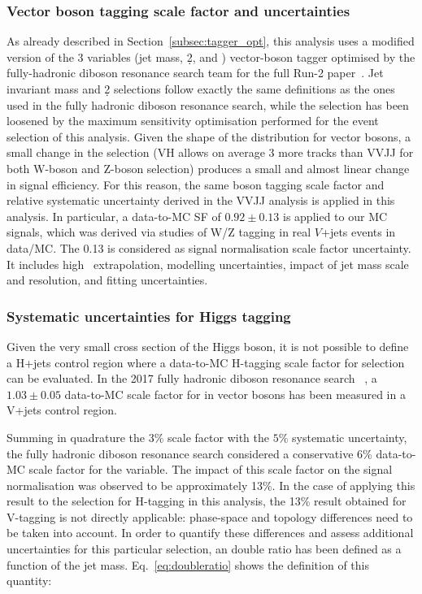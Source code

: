 \subsubsection{Vector boson tagging scale factor and uncertainties}
\label{sec:syst-vec-boson}
As already described in Section~\ref{subsec:tagger_opt}, this analysis uses a modified version of the 3 variables (jet mass, \d2, and \ntrk) vector-boson tagger optimised by the fully-hadronic diboson resonance search team for the full Run-2 paper~\cite{VVJJPaper2019}. Jet invariant mass and \d2 selections follow exactly the same definitions as the ones used in the fully hadronic diboson resonance search, while the \ntrk selection has been loosened by the maximum sensitivity optimisation performed for the event selection of this analysis.
Given the shape of the \ntrk distribution for vector bosons, a small change in the \ntrk selection (VH allows on average 3 more tracks than VVJJ for both W-boson and Z-boson selection) produces a small and almost linear change in signal efficiency.
For this reason, the same boson tagging scale factor and relative systematic uncertainty derived in the VVJJ analysis is applied in this analysis.
In particular, a data-to-MC SF of $0.92\pm0.13$ is applied to our MC signals, which was derived via studies of W/Z tagging in real $V$+jets events in data/MC. The 0.13 is considered as signal normalisation scale factor uncertainty. It includes high \pt\ extrapolation, modelling uncertainties, impact of jet mass scale and resolution, and fitting uncertainties.

\subsubsection{Systematic uncertainties for Higgs tagging}
\label{sec:syst-h-boson}
Given the very small cross section of the Higgs boson, it is not possible to define a H+jets control region where a data-to-MC H-tagging scale factor for \ntrk selection can be evaluated.
In the 2017 fully hadronic diboson resonance search ~\cite{VVJJPaper2017}, a $1.03\pm0.05$ data-to-MC scale factor for \ntrk in vector bosons has been measured in a V+jets control region.

Summing in quadrature the $3\%$ scale factor with the $5\%$ systematic uncertainty, the fully hadronic diboson resonance search considered a conservative 6\% data-to-MC scale factor for the \ntrk variable.
The impact of this scale factor on the signal normalisation was observed to be approximately 13\%.
In the case of applying this result to the \ntrk selection for H-tagging in this analysis, the 13\% result obtained for V-tagging is not directly applicable: phase-space and topology differences need to be taken into account.
In order to quantify these differences and assess additional uncertainties for this particular selection, an \ntrk double ratio has been defined as a function of the jet mass.
Eq.~\ref{eq:doubleratio} shows the definition of this quantity:

